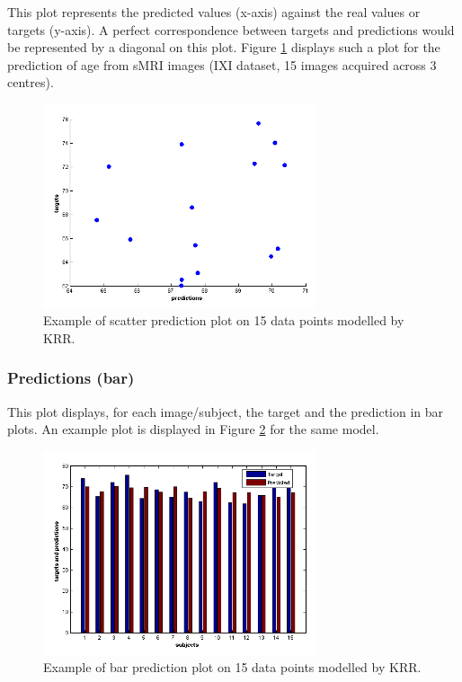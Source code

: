 This plot represents the predicted values (x-axis) against the real values or targets (y-axis). A perfect correspondence between targets and predictions would be represented by a diagonal on this plot. Figure \ref{fig_prt_ui_results_plots_predReg} displays such a plot for the prediction of age from sMRI images (IXI dataset, 15 images acquired across 3 centres).

\begin{figure}[h!]
\begin{center}
\includegraphics[height=6cm]{images/prt_ui_results_plots_predReg.png}
\caption{Example of scatter prediction plot on 15 data points modelled by KRR.}
\label{fig_prt_ui_results_plots_predReg}
\end{center}
\end{figure}

\subsubsection{Predictions (bar)}

This plot displays, for each image/subject, the target and the prediction in bar plots. An example plot is displayed in Figure \ref{fig_prt_ui_results_plots_bar} for the same model. 

\begin{figure}[h!]
\begin{center}
\includegraphics[height=6cm]{images/prt_ui_results_plots_bar.png}
\caption{Example of bar prediction plot on 15 data points modelled by KRR.}
\label{fig_prt_ui_results_plots_bar}
\end{center}
\end{figure}

